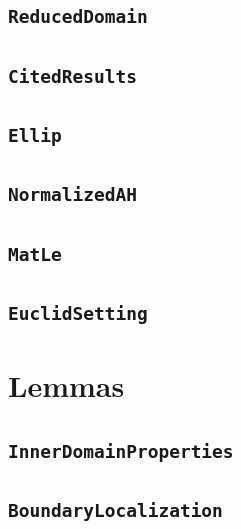 \documentclass[11pt]{amsart}
\theoremstyle{definition}
\begin{document}
\subsection{\texorpdfstring{\texttt{ReducedDomain}}{ReducedDomain}}\label{node:ReducedDomain}


\subsection{\texorpdfstring{\texttt{CitedResults}}{CitedResults}}\label{node:CitedResults}


\subsection{\texorpdfstring{\texttt{Ellip}}{Ellip}}\label{node:Ellip}


\subsection{\texorpdfstring{\texttt{NormalizedAH}}{NormalizedAH}}\label{node:NormalizedAH}


\subsection{\texorpdfstring{\texttt{MatLe}}{MatLe}}\label{node:MatLe}


\subsection{\texorpdfstring{\texttt{EuclidSetting}}{EuclidSetting}}\label{node:EuclidSetting}


\section{Lemmas}
\subsection{\texorpdfstring{\texttt{InnerDomainProperties}}{InnerDomainProperties}}\label{node:InnerDomainProperties}


\subsection{\texorpdfstring{\texttt{BoundaryLocalization}}{BoundaryLocalization}}\label{node:BoundaryLocalization}

\end{document}
